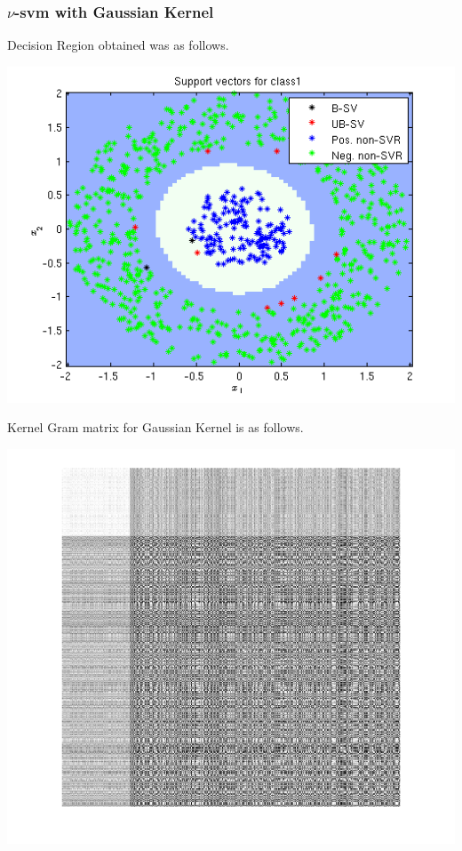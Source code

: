 \documentclass{article}
\begin{document}
\newpage

\subsubsection{$\nu$-svm with Gaussian Kernel}
Decision Region obtained was as follows.
\begin{center}
\includegraphics[scale=1]{Classification/1b/nu_g/dec}
\end{center}

\newpage
Kernel Gram matrix for Gaussian Kernel is as follows.
\begin{center}
\includegraphics[scale=0.6]{Classification/1b/nu_g/kgm}
\end{center}
\end{document}
